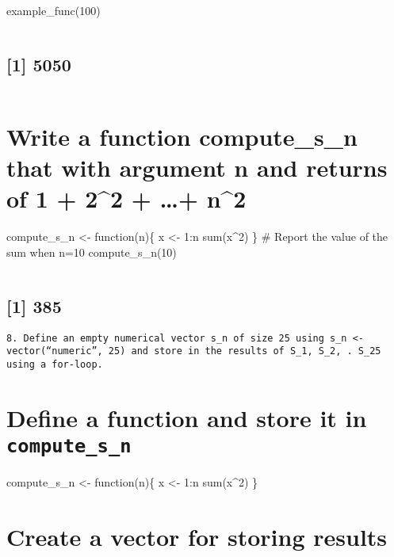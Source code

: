 \documentclass[
]{article}
\begin{document}
example\_func(100)

\begin{verbatim}
\end{verbatim}

\hypertarget{section-5}{%
\subsection{{[}1{]} 5050}\label{section-5}}

\begin{verbatim}
\end{verbatim}

\hypertarget{write-a-function-compute_s_n-that-with-argument-n-and-returns-of-1-22-n2}{%
\section{Write a function compute\_s\_n that with argument n and returns
of 1 + 2\^{}2 + \ldots+
n\^{}2}\label{write-a-function-compute_s_n-that-with-argument-n-and-returns-of-1-22-n2}}

compute\_s\_n \textless- function(n)\{ x \textless- 1:n sum(x\^{}2) \}
\# Report the value of the sum when n=10 compute\_s\_n(10)

\begin{verbatim}
\end{verbatim}

\hypertarget{section-6}{%
\subsection{{[}1{]} 385}\label{section-6}}

\begin{verbatim}
8. Define an empty numerical vector s_n of size 25 using s_n <- vector(“numeric”, 25) and store in the results of S_1, S_2, . S_25 using a for-loop.
\end{verbatim}

\hypertarget{define-a-function-and-store-it-in-compute_s_n}{%
\section{\texorpdfstring{Define a function and store it in
\texttt{compute\_s\_n}}{Define a function and store it in compute\_s\_n}}\label{define-a-function-and-store-it-in-compute_s_n}}

compute\_s\_n \textless- function(n)\{ x \textless- 1:n sum(x\^{}2) \}

\hypertarget{create-a-vector-for-storing-results}{%
\section{Create a vector for storing
results}\label{create-a-vector-for-storing-results}}
\end{document}
